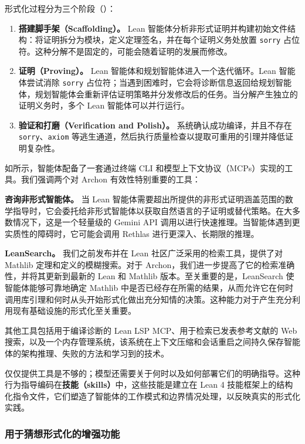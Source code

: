 形式化过程分为三个阶段（）：
\begin{enumerate}
    \item \textbf{搭建脚手架（Scaffolding）。} Lean 智能体分析非形式证明并构建初始文件结构：将证明拆分为模块，定义定理签名，并在每个证明义务处放置 \texttt{sorry} 占位符。这种分解不是固定的，可能会随着证明的发展而修改。
    \item \textbf{证明（Proving）。} Lean 智能体和规划智能体进入一个迭代循环。Lean 智能体尝试消除 \texttt{sorry} 占位符；当遇到困难时，它会将诊断信息返回给规划智能体，规划智能体会重新评估证明策略并分发修改后的任务。当分解产生独立的证明义务时，多个 Lean 智能体可以并行运行。
    \item \textbf{验证和打磨（Verification and Polish）。} 系统确认成功编译，并且不存在 \texttt{sorry}、\texttt{axiom} 等逃生通道，然后执行质量检查以提取可重用的引理并降低证明复杂性。
\end{enumerate}

如所示，智能体配备了一套通过终端 CLI 和模型上下文协议（MCPs）实现的工具。我们强调两个对 Archon 有效性特别重要的工具：

\textbf{咨询非形式智能体。} 当 Lean 智能体需要超出所提供的非形式证明涵盖范围的数学指导时，它会委托给非形式智能体以获取自然语言的子证明或替代策略。在大多数情况下，这是一个轻量级的 Gemini API 调用以进行快速推理。当智能体遇到更实质性的障碍时，它可能会调用 Rethlas 进行更深入、长期限的推理。

\textbf{LeanSearch。} 我们之前发布并在 Lean 社区广泛采用的检索工具，提供了对 Mathlib 定理和定义的模糊搜索。对于 Archon，我们进一步提高了它的检索准确性，并将其更新到最新的 Lean 和 Mathlib 版本。至关重要的是，LeanSearch 使智能体能够可靠地确定 Mathlib 中是否已经存在所需的结果，从而允许它在何时调用库引理和何时从头开始形式化做出充分知情的决策。这种能力对于产生充分利用现有基础设施的形式化至关重要。

其他工具包括用于编译诊断的 Lean LSP MCP、用于检索已发表参考文献的 Web 搜索，以及一个内存管理系统，该系统在上下文压缩和会话重启之间持久保存智能体的架构推理、失败的方法和学习到的技术。

仅仅提供工具是不够的；模型还需要关于何时以及如何部署它们的明确指导。这种行为指导编码在\textbf{技能（skills）}中，这些技能是建立在 Lean 4 技能框架上的结构化指令文件，它们塑造了智能体的工作模式和边界情况处理，以反映真实的形式化实践。







\subsubsection{用于猜想形式化的增强功能\label{subsubsec:enhancements}}

